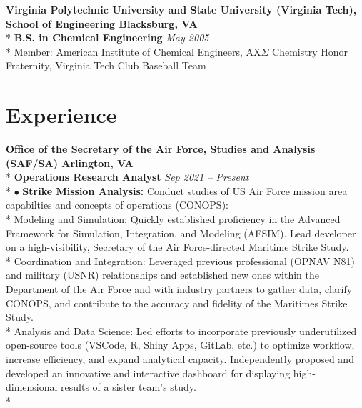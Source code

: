 \documentclass{article}
\begin{document}
\noindent \textbf{Virginia Polytechnic University and State University (Virginia Tech), School of Engineering \hfill Blacksburg, VA} \\*
\textbf{B.S. in Chemical Engineering} \hfill \textit{May 2005} \\*
\textendash Member: American Institute of Chemical Engineers, AX$\Sigma$ Chemistry Honor Fraternity, Virginia Tech Club Baseball Team 

\section{Experience}
\noindent \textbf{Office of the Secretary of the Air Force, Studies and Analysis (SAF/SA) \hfill Arlington, VA} \\*
\textbf{Operations Research Analyst} \hfill \textit{Sep 2021 -- Present} \\*
$\bullet$ \textbf{Strike Mission Analysis:} Conduct studies of US Air Force mission area capabilties and concepts of operations (CONOPS):\\*
\indent \textendash Modeling and Simulation: Quickly established proficiency in the Advanced Framework for Simulation, Integration, and Modeling (AFSIM). Lead developer on a high-visibility, Secretary of the Air Force-directed Maritime Strike Study. \\*
\indent \textendash Coordination and Integration: Leveraged previous professional (OPNAV N81) and military (USNR) relationships and established new ones within the Department of the Air Force and with industry partners to gather data, clarify CONOPS, and contribute to the accuracy and fidelity of the Maritimes Strike Study. \\*
\indent \textendash Analysis and Data Science: Led efforts to incorporate previously underutilized open-source tools (VSCode, R, Shiny Apps, GitLab, etc.) to optimize workflow, increase efficiency, and expand analytical capacity. Independently proposed and developed an innovative and interactive dashboard for displaying high-dimensional results of a sister team's study. \\*
\end{document}
